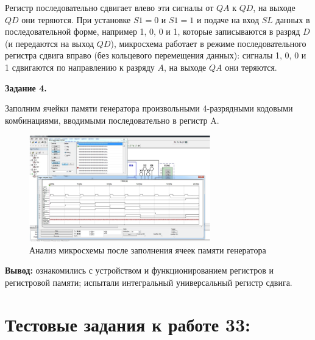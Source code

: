 \documentclass[spec, och, labwork]{shiza}
\begin{document}
  Регистр последовательно сдвигает влево эти сигналы от $QA$ к $QD$, на выходе $QD$ они теряются. При установке $S1 = 0$ и $S1 = 1$ и подаче на вход $SL$ данных в последовательной форме, например 1, 0, 0 и 1, которые записываются в разряд $D$ (и передаются на выход $QD$), микросхема работает в режиме последовательного регистра сдвига вправо (без кольцевого перемещения данных): сигналы 1, 0, 0 и 1 сдвигаются по направлению к разряду $A$, на выходе $QA$ они теряются.

  \textbf{Задание 4.}

  Заполним ячейки памяти генератора произвольными 4-разрядными кодовыми комбинациями, вводимыми последовательно в регистр A.

  \begin{figure}[H]
    \centering     
    \includegraphics[width=0.7\textwidth]{photo/6}
    \caption{Анализ микросхемы после заполнения ячеек памяти генератора}
  \end{figure}

  \textbf{Вывод:} ознакомились с устройством и функционированием регистров и регистровой памяти; испытали интегральный универсальный регистр сдвига.

  \section{Тестовые задания к работе 33:}
\end{document}
